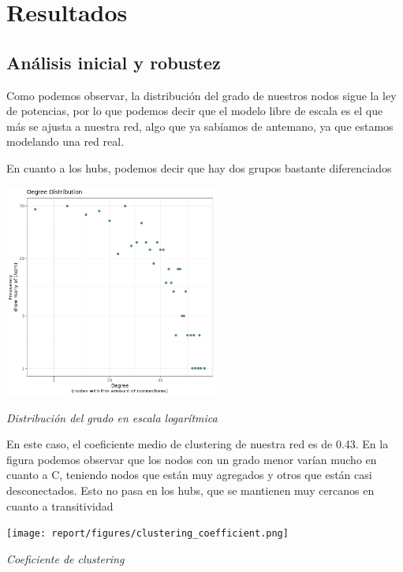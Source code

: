 
\section{Resultados}

\subsection{Análisis inicial y robustez}

Como podemos observar, la distribución del grado de nuestros nodos sigue  la ley de potencias, por lo que podemos decir que el modelo libre de escala es el que más se ajusta a
nuestra red, algo que ya sabíamos de antemano, ya que estamos modelando una red real.

En cuanto a los hubs, podemos decir que hay dos grupos bastante diferenciados 
\begin{center}

\includegraphics[width=70mm,scale=1.2]{report/figures/degree_distribution.png}

\caption{\textit{Distribución del grado en escala logarítmica}}

\end{center}

En este caso, el coeficiente medio de clustering de nuestra red es de 0.43.
En la figura podemos observar que los nodos con un grado menor varían mucho en cuanto a C, teniendo nodos que están muy agregados y otros que están casi desconectados. 
Esto no pasa en los hubs, que se mantienen muy cercanos en cuanto a transitividad

\begin{center}

\texttt{[image: report/figures/clustering\_coefficient.png]}

\caption{\textit{Coeficiente de clustering}}

\end{center}

